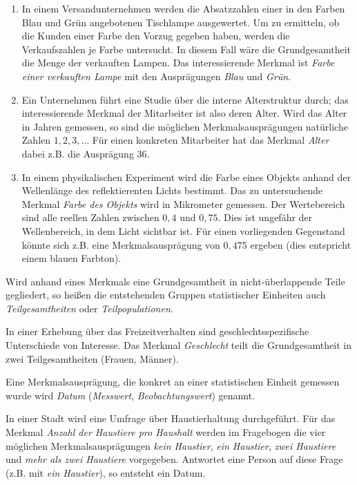 \documentclass{lecture}
\begin{document}
    \begin{example}
        \begin{enumerate}
            \item In einem Versandunternehmen werden die Absatzzahlen einer in den Farben Blau und Grün angebotenen Tischlampe ausgewertet.
            Um zu ermitteln, ob die Kunden einer Farbe den Vorzug gegeben haben, werden die Verkaufszahlen je Farbe untersucht.
            In diesem Fall wäre die Grundgesamtheit die Menge der verkauften Lampen.
            Das interessierende Merkmal ist \emph{Farbe einer verkauften Lampe} mit den Ausprägungen \emph{Blau} und \emph{Grün}.
            \item Ein Unternehmen führt eine Studie über die interne Alterstruktur durch; das interessierende Merkmal der Mitarbeiter ist also deren Alter.
            Wird das Alter in Jahren gemessen, so sind die möglichen Merkmalsausprägungen natürliche Zahlen \(1, 2, 3, \ldots\)
            Für einen konkreten Mitarbeiter hat das Merkmal \emph{Alter} dabei z.B. die Ausprägung \(36\).
            \item In einem physikalischen Experiment wird die Farbe eines Objekts anhand der Wellenlänge des reflektierenten Lichts bestimmt.
            Das zu untersuchende Merkmal \emph{Farbe des Objekts} wird in Mikrometer gemessen.
            Der Wertebereich sind alle reellen Zahlen zwischen \(0,4\) und \(0,75\).
            Dies ist ungefähr der Wellenbereich, in dem Licht sichtbar ist.
            Für einen vorliegenden Gegenstand könnte sich z.B. eine Merkmalsausprägung von \(0,475\) ergeben (dies entspricht einem blauen Farbton).
        \end{enumerate}
    \end{example}
    Wird anhand eines Merkmals eine Grundgesamtheit in nicht-überlappende Teile gegliedert, so heißen die entstehenden Gruppen statistischer Einheiten auch \emph{Teilgesamtheiten} oder \emph{Teilpopulationen}.
    \begin{example}
        In einer Erhebung über das Freizeitverhalten sind geschlechtsspezifische Unterschiede von Interesse.
        Das Merkmal \emph{Geschlecht} teilt die Grundgesamtheit in zwei Teilgesamtheiten (Frauen, Männer).
    \end{example}
    Eine Merkmalsausprägung, die konkret an einer statistischen Einheit gemessen wurde wird \emph{Datum} (\emph{Messwert}, \emph{Beobachtungswert}) genannt.
    \begin{example}
        In einer Stadt wird eine Umfrage über Haustierhaltung durchgeführt.
        Für das Merkmal \emph{Anzahl der Haustiere pro Haushalt} werden im Fragebogen die vier möglichen Merkmalsausprägungen \emph{kein Haustier}, \emph{ein Haustier}, \emph{zwei Haustiere} und \emph{mehr als zwei Haustiere} vorgegeben.
        Antwortet eine Person auf diese Frage (z.B. mit \emph{ein Haustier}), so entsteht ein Datum.
    \end{example}
\end{document}
